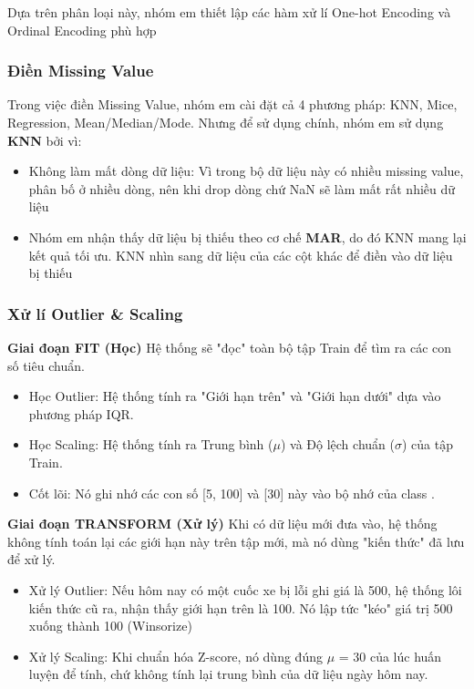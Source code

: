 Dựa trên phân loại này, nhóm em thiết lập các hàm xử lí One-hot Encoding và Ordinal Encoding phù hợp

\subsubsection{Điền Missing Value}
Trong việc điền Missing Value, nhóm em cài đặt cả 4 phương pháp: KNN, Mice, Regression, Mean/Median/Mode. Nhưng để sử dụng chính, nhóm em sử dụng \textbf{KNN} bởi vì:
\begin{itemize}
    \item Không làm mất dòng dữ liệu: Vì trong bộ dữ liệu này có nhiều missing value, phân bố ở nhiều dòng, nên khi drop dòng chứ NaN sẽ làm mất rất nhiều dữ liệu 
    \item Nhóm em nhận thấy dữ liệu bị thiếu theo cơ chế \textbf{MAR}, do đó KNN mang lại kết quả tối ưu. KNN nhìn sang dữ liệu của các cột khác để điền vào dữ liệu bị thiếu
\end{itemize}

\subsubsection{Xử lí Outlier \& Scaling}

\textbf{Giai đoạn FIT (Học)}
Hệ thống sẽ "đọc" toàn bộ tập Train  để tìm ra các con số tiêu chuẩn.
\begin{itemize}
    \item Học Outlier: Hệ thống tính ra "Giới hạn trên" và "Giới hạn dưới" dựa vào phương pháp IQR.
    \item Học Scaling: Hệ thống tính ra Trung bình ($\mu$) và Độ lệch chuẩn ($\sigma$) của tập Train.
    \item Cốt lõi: Nó ghi nhớ các con số [5, 100] và [30] này vào bộ nhớ của class .
\end{itemize}

\textbf{Giai đoạn TRANSFORM (Xử lý)}
Khi có dữ liệu mới đưa vào, hệ thống không tính toán lại các giới hạn này trên tập mới, mà nó dùng "kiến thức" đã lưu để xử lý.
\begin{itemize}
    \item Xử lý Outlier: Nếu hôm nay có một cuốc xe bị lỗi ghi giá là 500, hệ thống lôi kiến thức cũ ra, nhận thấy giới hạn trên là 100. Nó lập tức "kéo" giá trị 500 xuống thành 100 (Winsorize)
    \item Xử lý Scaling: Khi chuẩn hóa Z-score, nó dùng đúng $\mu$ = 30 của lúc huấn luyện để tính, chứ không tính lại trung bình của dữ liệu ngày hôm nay.
\end{itemize}

